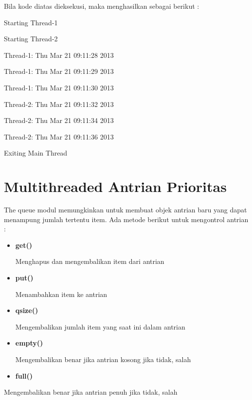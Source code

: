\documentclass [12pt,a4paper,notitlepage,oneside,bahasa]{article}
\begin{document}
Bila kode diatas dieksekusi, maka menghasilkan sebagai berikut : \par
{\fontsize{10pt}{10pt}\selectfont Starting Thread-1} \par
\noindent 
{\fontsize{10pt}{10pt}\selectfont Starting Thread-2} \par
\noindent 
{\fontsize{10pt}{10pt}\selectfont Thread-1: Thu Mar 21 09:11:28 2013} \par
\noindent 
{\fontsize{10pt}{10pt}\selectfont Thread-1: Thu Mar 21 09:11:29 2013} \par
\noindent 
{\fontsize{10pt}{10pt}\selectfont Thread-1: Thu Mar 21 09:11:30 2013} \par
\noindent 
{\fontsize{10pt}{10pt}\selectfont Thread-2: Thu Mar 21 09:11:32 2013} \par
\noindent 
{\fontsize{10pt}{10pt}\selectfont Thread-2: Thu Mar 21 09:11:34 2013} \par
\noindent 
{\fontsize{10pt}{10pt}\selectfont Thread-2: Thu Mar 21 09:11:36 2013} \par
\noindent 
{\fontsize{10pt}{10pt}\selectfont Exiting Main Thread} \par

\vspace{12pt}

\section{Multithreaded Antrian Prioritas} \par
The queue modul memungkinkan untuk membuat objek antrian baru yang dapat menampung jumlah tertentu item. Ada metode berikut untuk mengontrol antrian : \par

\begin{itemize}
	\item \textbf{get()} \par
		Menghapus dan mengembalikan item dari antrian
	\par
	\item \textbf{put()} \par
		Menambahkan item ke antrian
	\par
	\item \textbf{qsize()} \par
		Mengembalikan jumlah item yang saat ini dalam antrian
	\par
	\item \textbf{empty()} \par
		Mengembalikan benar jika antrian kosong jika tidak, salah
	\par
	\item \textbf{full()}\end{itemize}
\par
	Mengembalikan benar jika antrian penuh jika tidak, salah
\end{document}
